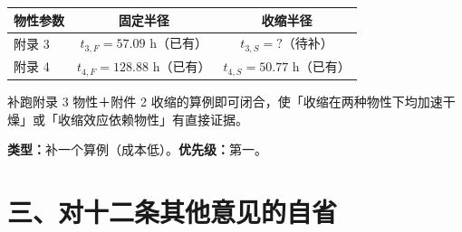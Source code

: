 \documentclass[12pt,a4paper]{ctexart}
\begin{document}
\begin{center}
{\begin{tabular}{lcc}
\toprule
物性参数 & 固定半径 & 收缩半径 \\
\midrule
附录 3 & $t_{3,F}=57.09$ h（已有） & $t_{3,S}=?$（待补） \\
附录 4 & $t_{4,F}=128.88$ h（已有） & $t_{4,S}=50.77$ h（已有） \\
\bottomrule
\end{tabular}}
\end{center}

补跑附录 3 物性＋附件 2 收缩的算例即可闭合，使「收缩在两种物性下均加速干燥」或「收缩效应依赖物性」有直接证据。

\textbf{类型：}补一个算例（成本低）。\textbf{优先级：}第一。

\section{三、对十二条其他意见的自省}
\end{document}
